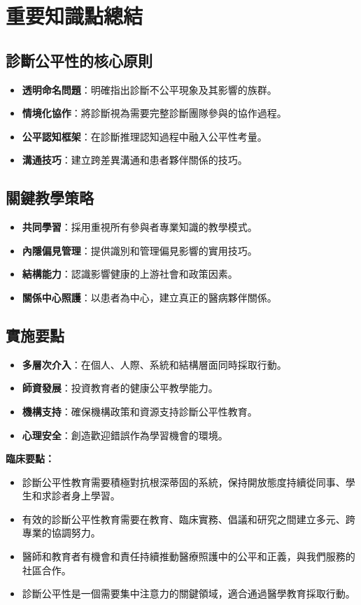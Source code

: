 \documentclass[12pt,a4paper]{article}
\begin{document}
\section{重要知識點總結}

\subsection{診斷公平性的核心原則}
\begin{itemize}[nosep]
    \item \textbf{透明命名問題}：明確指出診斷不公平現象及其影響的族群。
    \item \textbf{情境化協作}：將診斷視為需要完整診斷團隊參與的協作過程。
    \item \textbf{公平認知框架}：在診斷推理認知過程中融入公平性考量。
    \item \textbf{溝通技巧}：建立跨差異溝通和患者夥伴關係的技巧。
\end{itemize}

\subsection{關鍵教學策略}
\begin{itemize}[nosep]
    \item \textbf{共同學習}：採用重視所有參與者專業知識的教學模式。
    \item \textbf{內隱偏見管理}：提供識別和管理偏見影響的實用技巧。
    \item \textbf{結構能力}：認識影響健康的上游社會和政策因素。
    \item \textbf{關係中心照護}：以患者為中心，建立真正的醫病夥伴關係。
\end{itemize}

\subsection{實施要點}
\begin{itemize}[nosep]
    \item \textbf{多層次介入}：在個人、人際、系統和結構層面同時採取行動。
    \item \textbf{師資發展}：投資教育者的健康公平教學能力。
    \item \textbf{機構支持}：確保機構政策和資源支持診斷公平性教育。
    \item \textbf{心理安全}：創造歡迎錯誤作為學習機會的環境。
\end{itemize}

\begin{importantbox}
\textbf{臨床要點：}
\begin{itemize}[nosep]
    \item 診斷公平性教育需要積極對抗根深蒂固的系統，保持開放態度持續從同事、學生和求診者身上學習。
    \item 有效的診斷公平性教育需要在教育、臨床實務、倡議和研究之間建立多元、跨專業的協調努力。
    \item 醫師和教育者有機會和責任持續推動醫療照護中的公平和正義，與我們服務的社區合作。
    \item 診斷公平性是一個需要集中注意力的關鍵領域，適合通過醫學教育採取行動。
\end{itemize}
\end{importantbox}
\end{document}
